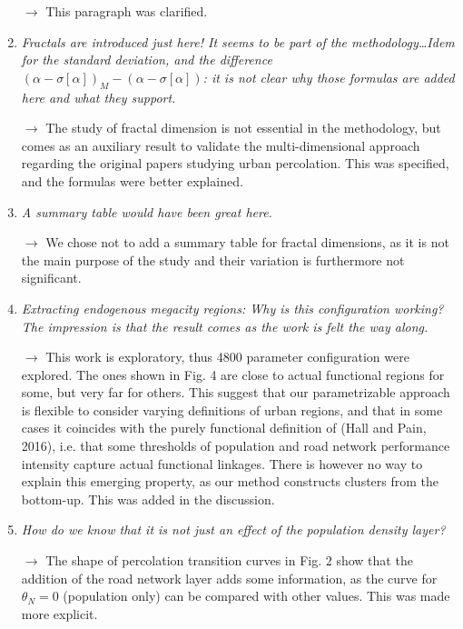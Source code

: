 \documentclass[11pt,a4paper,sans]{moderncv}        %
\begin{document}
\begin{enumerate}
$\rightarrow$ This paragraph was clarified.

\medskip


\item \textit{Fractals are introduced just here! It seems to be part of the methodology\ldots Idem for the standard deviation, and the difference $(\alpha - \sigma \left[\alpha\right])_M - (\alpha - \sigma\left[\alpha\right])$: it is not clear why those formulas are added here and what they support.}

$\rightarrow$ The study of fractal dimension is not essential in the methodology, but comes as an auxiliary result to validate the multi-dimensional approach regarding the original papers studying urban percolation. This was specified, and the formulas were better explained.

\medskip

\item \textit{A summary table would have been great here.}

$\rightarrow$ We chose not to add a summary table for fractal dimensions, as it is not the main purpose of the study and their variation is furthermore not significant.

\medskip

\item \textit{Extracting endogenous megacity regions: Why is this configuration working? The impression is that the result comes as the work is felt the way along.}

$\rightarrow$ This work is exploratory, thus 4800 parameter configuration were explored. The ones shown in Fig. 4 are close to actual functional regions for some, but very far for others. This suggest that our parametrizable approach is flexible to consider varying definitions of urban regions, and that in some cases it coincides with the purely functional definition of (Hall and Pain, 2016), i.e. that some thresholds of population and road network performance intensity capture actual functional linkages. There is however no way to explain this emerging property, as our method constructs clusters from the bottom-up. This was added in the discussion.

\medskip

\item \textit{How do we know that it is not just an effect of the population density layer?}

$\rightarrow$ The shape of percolation transition curves in Fig. 2 show that the addition of the road network layer adds some information, as the curve for $\theta_N = 0$ (population only) can be compared with other values. This was made more explicit.


\end{enumerate}
\end{document}

